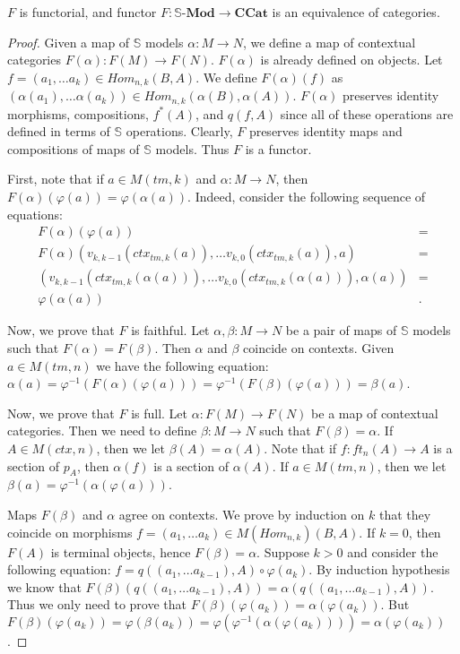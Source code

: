 \documentclass[reqno]{amsart}
\theoremstyle{definition}
\theoremstyle{remark}
\newcommand{\cat}[1]{\mathbf{#1}}
\newcommand{\ccat}{\cat{CCat}}
\newcommand{\substTh}{\mathbb{S}}
\newcommand{\Mod}[1]{#1\text{-}\cat{Mod}}
\numberwithin{figure}{section}
\begin{document}
\begin{prop}[T1-CCat]
$F$ is functorial, and functor $F : \Mod{\substTh} \to \ccat$ is an equivalence of categories.
\end{prop}
\begin{proof}
Given a map of $\substTh$ models $\alpha : M \to N$, we define a map of contextual categories $F(\alpha) : F(M) \to F(N)$.
$F(\alpha)$ is already defined on objects.
Let $f = (a_1, \ldots a_k) \in Hom_{n,k}(B,A)$.
We define $F(\alpha)(f)$ as $(\alpha(a_1), \ldots \alpha(a_k)) \in Hom_{n,k}(\alpha(B), \alpha(A))$.
$F(\alpha)$ preserves identity morphisms, compositions, $f^*(A)$, and $q(f,A)$ since all of these operations are defined in terms of $\substTh$ operations.
Clearly, $F$ preserves identity maps and compositions of maps of $\substTh$ models.
Thus $F$ is a functor.

First, note that if $a \in M(tm,k)$ and $\alpha : M \to N$, then $F(\alpha)(\varphi(a)) = \varphi(\alpha(a))$.
Indeed, consider the following sequence of equations:
\begin{align*}
F(\alpha)(\varphi(a)) & = \\
F(\alpha)(v_{k,k-1}(ctx_{tm,k}(a)), \ldots v_{k,0}(ctx_{tm,k}(a)), a) & = \\
(v_{k,k-1}(ctx_{tm,k}(\alpha(a))), \ldots v_{k,0}(ctx_{tm,k}(\alpha(a))), \alpha(a)) & = \\
\varphi(\alpha(a)) & .
\end{align*}

Now, we prove that $F$ is faithful.
Let $\alpha,\beta : M \to N$ be a pair of maps of $\substTh$ models such that $F(\alpha) = F(\beta)$.
Then $\alpha$ and $\beta$ coincide on contexts.
Given $a \in M(tm,n)$ we have the following equation: $\alpha(a) = \varphi^{-1}(F(\alpha)(\varphi(a))) = \varphi^{-1}(F(\beta)(\varphi(a))) = \beta(a)$.

Now, we prove that $F$ is full.
Let $\alpha : F(M) \to F(N)$ be a map of contextual categories.
Then we need to define $\beta : M \to N$ such that $F(\beta) = \alpha$.
If $A \in M(ctx,n)$, then we let $\beta(A) = \alpha(A)$.
Note that if $f : ft_n(A) \to A$ is a section of $p_A$, then $\alpha(f)$ is a section of $\alpha(A)$.
If $a \in M(tm,n)$, then we let $\beta(a) = \varphi^{-1}(\alpha(\varphi(a)))$.

Maps $F(\beta)$ and $\alpha$ agree on contexts.
We prove by induction on $k$ that they coincide on morphisms $f = (a_1, \ldots a_k) \in M(Hom_{n,k})(B,A)$.
If $k = 0$, then $F(A)$ is terminal objects, hence $F(\beta) = \alpha$.
Suppose $k > 0$ and consider the following equation: $f = q((a_1, \ldots a_{k-1}), A) \circ \varphi(a_k)$.
By induction hypothesis we know that $F(\beta)(q((a_1, \ldots a_{k-1}), A)) = \alpha(q((a_1, \ldots a_{k-1}), A))$.
Thus we only need to prove that $F(\beta)(\varphi(a_k)) = \alpha(\varphi(a_k))$.
But $F(\beta)(\varphi(a_k)) = \varphi(\beta(a_k)) = \varphi(\varphi^{-1}(\alpha(\varphi(a_k)))) = \alpha(\varphi(a_k))$.


\end{proof}
\end{document}
